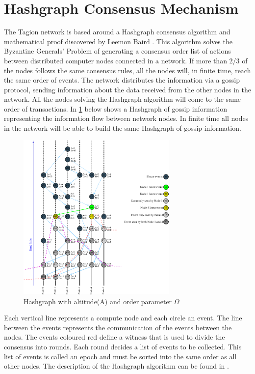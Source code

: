\section{Hashgraph Consensus Mechanism} 
\label{sec:hashgraph_cm}
The Tagion network is based around a Hashgraph consensus algorithm and mathematical proof discovered by Leemon Baird \cite{SWIRLDS_HASHGRAPH}. This algorithm solves the Byzantine Generals’ Problem of generating a consensus order list of actions between distributed computer nodes connected in a network.
If more than 2/3 of the nodes follows the same consensus rules, all the nodes will, in finite time, reach the same order of events.
The network distributes the information via a gossip protocol, sending information about the data received from the other nodes in the network. All the nodes solving the Hashgraph algorithm will come to the same order of transactions.
In \cref{fig:wavefront} below shows a Hashgraph of gossip information representing the information flow between network nodes. In finite time all nodes in the network will be able to build the same Hashgraph of gossip information.


\begin{figure}[ht]
 \centering
 \includegraphics[width=0.7\textwidth]{fig/wavefront_and_order_long.eps}
 \caption{Hashgraph with altitude(A) and order parameter $\Omega$}
 \label{fig:wavefront}
\end{figure}

Each vertical line represents a compute node and each circle an event. The line between the events represents the communication of the events between the nodes. 
The events coloured red define a witness that is used to divide the consensus into rounds. Each round decides a list of events to be collected. This list of events is called an epoch and must be sorted into the same order as all other nodes. The description of the Hashgraph algorithm can be found in \cite{SWIRLDS_HASHGRAPH}.

\pagebreak



\pagebreak


